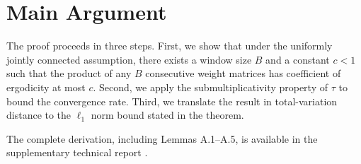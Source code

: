 \section{Main Argument}

The proof proceeds in three steps. First, we show that under the uniformly
jointly connected assumption, there exists a window size $B$ and a constant
$c < 1$ such that the product of any $B$ consecutive weight matrices has
coefficient of ergodicity at most $c$. Second, we apply the submultiplicativity
property of $\tau$ to bound the convergence rate. Third, we translate the
result in total-variation distance to the $\ell_1$ norm bound stated in
the theorem.

The complete derivation, including Lemmas A.1--A.5, is available in the
supplementary technical report \citep{calloway2026badc}.


